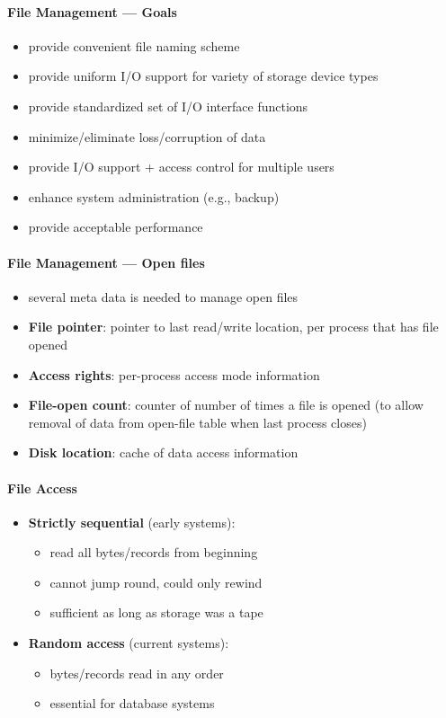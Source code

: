 \paragraph{File Management --- Goals}
\begin{itemize}
  \item provide convenient file naming scheme
  \item provide uniform I/O support for variety of storage device types
  \item provide standardized set of I/O interface functions
  \item minimize/eliminate loss/corruption of data
  \item provide I/O support + access control for multiple users
  \item enhance system administration (e.g., backup)
  \item provide acceptable performance
\end{itemize}

\paragraph{File Management --- Open files}
\begin{itemize}
  \item several meta data is needed to manage open files
  \item \textbf{File pointer}: pointer to last read/write location, per process that has file opened
  \item \textbf{Access rights}: per-process access mode information
  \item \textbf{File-open count}: counter of number of times a file is opened (to allow removal of data from open-file table when last process closes)
  \item \textbf{Disk location}: cache of data access information
\end{itemize}

\paragraph{File Access}
\begin{itemize}
  \item \textbf{Strictly sequential} (early systems):
  \begin{itemize}
    \item read all bytes/records from beginning
    \item cannot jump round, could only rewind
    \item sufficient as long as storage was a tape
  \end{itemize}
  \item \textbf{Random access} (current systems):
  \begin{itemize}
    \item bytes/records read in any order
    \item essential for database systems
  \end{itemize}
\end{itemize}

